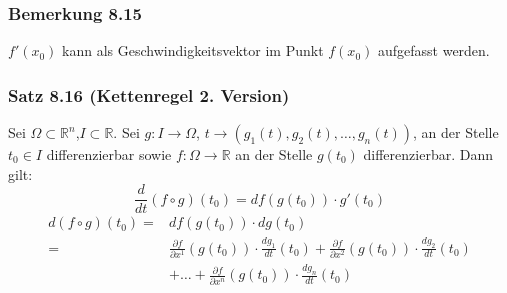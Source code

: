 \subsubsection*{Bemerkung 8.15}
$f'\left( x_0\right)$ kann als Geschwindigkeitsvektor im Punkt $f\left( x_0\right)$ aufgefasst werden.

\subsubsection*{Satz 8.16 (Kettenregel 2. Version)}
Sei $\Omega\subset\mathbb{R}^n$,$I\subset\mathbb{R}$. Sei $g:I\rightarrow\Omega$, $t\rightarrow\left( g_1(t), g_2(t),\dots, g_n(t)\right)$, an der Stelle $t_0\in I$ differenzierbar sowie $f:\Omega\rightarrow\mathbb{R}$ an der Stelle $g\left( t_0\right)$ differenzierbar. Dann gilt:
\[\frac{d}{{dt}}\left( {f \circ g} \right)\left( {{t_0}} \right) = df\left( {g\left( {{t_0}} \right)} \right) \cdot g'\left( {{t_0}} \right)\]
\begin{align*}
d\left( {f \circ g} \right)\left( {{t_0}} \right) = &df\left( {g\left( {{t_0}} \right)} \right) \cdot dg\left( {{t_0}} \right)\\
 = &\frac{{\partial f}}{{\partial {x^1}}}\left( {g\left( {{t_0}} \right)} \right) \cdot \frac{{d{g_1}}}{{dt}}\left( {{t_0}} \right) + \frac{{\partial f}}{{\partial {x^2}}}\left( {g\left( {{t_0}} \right)} \right) \cdot \frac{{d{g_2}}}{{dt}}\left( {{t_0}} \right)\\ & + \ldots  + \frac{{\partial f}}{{\partial {x^n}}}\left( {g\left( {{t_0}} \right)} \right) \cdot \frac{{d{g_n}}}{{dt}}\left( {{t_0}} \right)
\end{align*}

